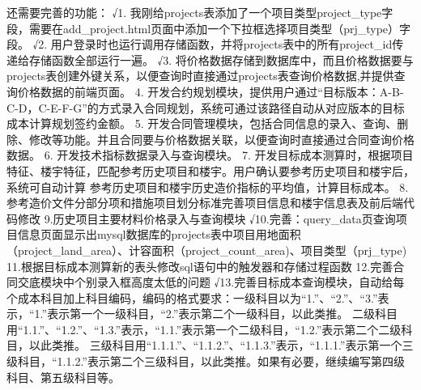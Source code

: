 还需要完善的功能：
√1. 我刚给projects表添加了一个项目类型project_type字段，需要在add_project.html页面中添加一个下拉框选择项目类型（prj_type）字段。
√2. 用户登录时也运行调用存储函数，并将projects表中的所有project_id传递给存储函数全部运行一遍。
√3. 将价格数据存储到数据库中，而且价格数据要与projects表创建外键关系，以便查询时直接通过projects表查询价格数据,并提供查询价格数据的前端页面。
4. 开发合约规划模块，提供用户通过“目标版本：A-B-C-D，C-E-F-G”的方式录入合同规划，系统可通过该路径自动从对应版本的目标成本计算规划签约金额。
5. 开发合同管理模块，包括合同信息的录入、查询、删除、修改等功能。并且合同要与价格数据关联，以便查询时直接通过合同查询价格数据。
6. 开发技术指标数据录入与查询模块。
7. 开发目标成本测算时，根据项目特征、楼宇特征，匹配参考历史项目和楼宇。用户确认要参考历史项目和楼宇后，系统可自动计算
   参考历史项目和楼宇历史造价指标的平均值，计算目标成本。
8.参考造价文件分部分项和措施项目划分标准完善项目信息和楼宇信息表及前后端代码修改
9.历史项目主要材料价格录入与查询模块
√10.完善：query_data页查询项目信息页面显示出mysql数据库的projects表中项目用地面积（project_land_area）、计容面积（project_count_area)、项目类型（prj_type)
11.根据目标成本测算新的表头修改sql语句中的触发器和存储过程函数
12.完善合同交底模块中个别录入框高度太低的问题
√13.完善目标成本查询模块，自动给每个成本科目加上科目编码，编码的格式要求：一级科目以为“1.”、“2.”、“3.”表示，“1.”表示第一个一级科目，“2.”表示第二个一级科目，以此类推。
二级科目用“1.1.”、“1.2.”、“1.3.”表示，“1.1.”表示第一个二级科目，“1.2.”表示第二个二级科目，以此类推。
三级科目用“1.1.1.”、“1.1.2.”、“1.1.3.”表示，“1.1.1.”表示第一个三级科目，“1.1.2.”表示第二个三级科目，以此类推。如果有必要，继续编写第四级科目、第五级科目等。